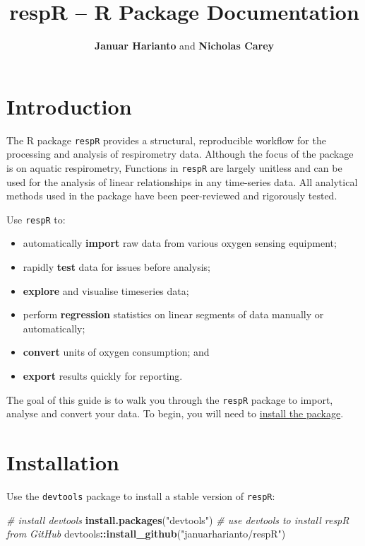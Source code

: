 \documentclass[]{book}
\title{respR -- R Package Documentation}
\author{\textbf{Januar Harianto} and \textbf{Nicholas Carey}}
\date{}
\newenvironment{Shaded}{\begin{snugshade}}{\end{snugshade}}
\newcommand{\KeywordTok}[1]{\textcolor[rgb]{0.13,0.29,0.53}{\textbf{#1}}}
\newcommand{\StringTok}[1]{\textcolor[rgb]{0.31,0.60,0.02}{#1}}
\newcommand{\CommentTok}[1]{\textcolor[rgb]{0.56,0.35,0.01}{\textit{#1}}}
\newcommand{\OperatorTok}[1]{\textcolor[rgb]{0.81,0.36,0.00}{\textbf{#1}}}
\newcommand{\NormalTok}[1]{#1}
\providecommand{\tightlist}{%
  \setlength{\itemsep}{0pt}\setlength{\parskip}{0pt}}
\begin{document}
\maketitle

{
\setcounter{tocdepth}{1}
\tableofcontents
}
\chapter{Introduction}\label{introduction}

The R package \texttt{respR} provides a structural, reproducible
workflow for the processing and analysis of respirometry data. Although
the focus of the package is on aquatic respirometry, Functions in
\texttt{respR} are largely unitless and can be used for the analysis of
linear relationships in any time-series data. All analytical methods
used in the package have been peer-reviewed and rigorously tested.

Use \texttt{respR} to:

\begin{itemize}
\tightlist
\item
  automatically \textbf{import} raw data from various oxygen sensing
  equipment;
\item
  rapidly \textbf{test} data for issues before analysis;
\item
  \textbf{explore} and visualise timeseries data;
\item
  perform \textbf{regression} statistics on linear segments of data
  manually or automatically;
\item
  \textbf{convert} units of oxygen consumption; and
\item
  \textbf{export} results quickly for reporting.
\end{itemize}

The goal of this guide is to walk you through the \texttt{respR} package
to import, analyse and convert your data. To begin, you will need to
\protect\hyperlink{installation}{install the package}.

\hypertarget{installation}{\chapter{Installation}\label{installation}}

Use the \texttt{devtools} package to install a stable version of
\texttt{respR}:

\begin{Shaded}
\begin{Highlighting}[]
\CommentTok{# install devtools}
\KeywordTok{install.packages}\NormalTok{(}\StringTok{"devtools"}\NormalTok{)}
\CommentTok{# use devtools to install respR from GitHub}
\NormalTok{devtools}\OperatorTok{::}\KeywordTok{install_github}\NormalTok{(}\StringTok{"januarharianto/respR"}\NormalTok{)}
\end{Highlighting}
\end{Shaded}
\end{document}
